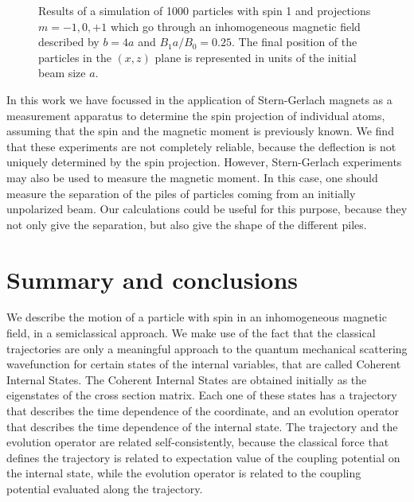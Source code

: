\begin{center}
\begin{figure}
\mbox{}
\caption{Results of a simulation of 1000 particles with spin 1 and projections
$m=-1,0,+1$ which go through an inhomogeneous magnetic field described by
$b=4a$ and $B_1a/B_0=0.25$. The final position of the particles in the $(x,z)$
plane is represented in units of the initial beam size $a$.}
\end{figure}
\end{center}

In this work we have focussed in the application of Stern-Gerlach magnets as
a measurement apparatus to determine the spin projection of individual atoms,
assuming that the spin and the magnetic moment is previously known. 
We find that these experiments are
not completely reliable, because the deflection is not uniquely determined by 
the spin projection. However, Stern-Gerlach experiments may also be used
to measure the magnetic moment. In this case, one should measure the separation
of the piles of particles coming from an initially unpolarized beam. 
Our calculations could be useful for this purpose, because they not only give
the separation, but also give the shape of the different piles. 

\section{Summary and conclusions}

We describe the motion of a particle with spin in an inhomogeneous magnetic 
field, in a semiclassical approach. We make use of the fact that
the  classical trajectories are only a meaningful approach to the quantum
mechanical scattering wavefunction for certain states of the internal
variables, that are called Coherent Internal States. The Coherent Internal
States are obtained initially as the eigenstates of the cross section matrix. 
Each one of these states has a trajectory that describes the time dependence 
of the
coordinate, and an evolution operator that describes the time dependence 
 of the internal state. The trajectory and the evolution operator are 
related self-consistently, because the classical force that
defines the trajectory is related to expectation value of the coupling
potential on the internal state, while the evolution operator is related 
to the coupling potential evaluated along the trajectory.


